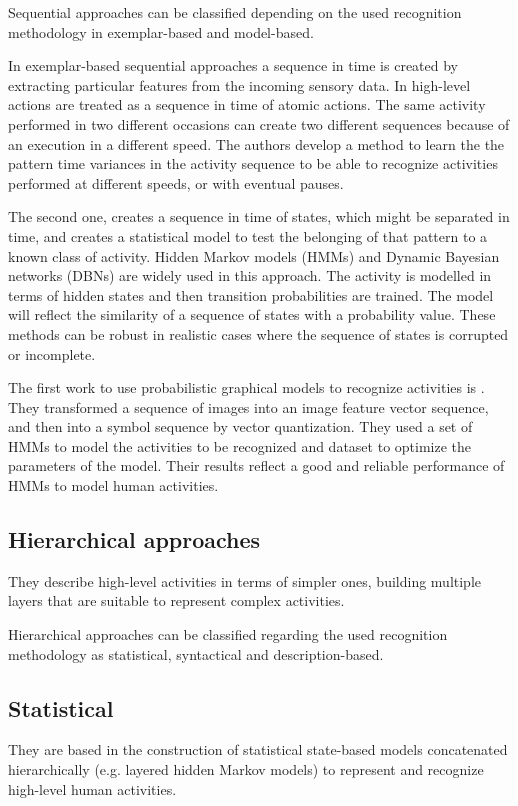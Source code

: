 \documentclass[a4paper, 12pt, openany, oneside]{book}
\begin{document}
Sequential approaches can be classified depending on the used recognition methodology in exemplar-based and model-based. 

In exemplar-based sequential approaches a sequence in time is created by extracting particular features from the incoming sensory data. In \citep{Veeraraghavan2006_FuncSpcAct} high-level actions are treated as a sequence in time of atomic actions. The same activity performed in two different occasions can create two different sequences because of an execution in a different speed. The authors develop a method to learn the the pattern time variances in the activity sequence to be able to recognize activities performed at different speeds, or with eventual pauses.

The second one, creates a sequence in time of states, which might be separated in time, and  creates a statistical model to test the belonging of that pattern to a known class of activity. Hidden Markov models (HMMs) and Dynamic Bayesian networks (DBNs) are widely used in this approach. The activity is modelled in terms of hidden states and then transition probabilities are trained. The model will reflect the similarity of a sequence of states with a probability value. These methods can be robust in realistic cases where the sequence of states is corrupted or incomplete.

The first work to use probabilistic graphical models to recognize activities is \citep{Yamato1992_RecHA_HMM}. They transformed a sequence of images into an image feature vector sequence, and then into a symbol sequence by vector quantization. They used a set of HMMs to model the activities to be recognized and dataset to optimize the parameters of the model. Their results reflect a good and reliable performance of HMMs to model human activities. 






\subsection{Hierarchical approaches}
They describe high-level activities in terms of simpler ones, building multiple layers that are suitable to represent complex activities.

Hierarchical approaches can be classified regarding the used recognition methodology as statistical, syntactical and description-based.

\subsection{Statistical}
They are based in the construction of statistical state-based models concatenated hierarchically (e.g. layered hidden Markov models) to represent and recognize high-level human activities.
\end{document}
